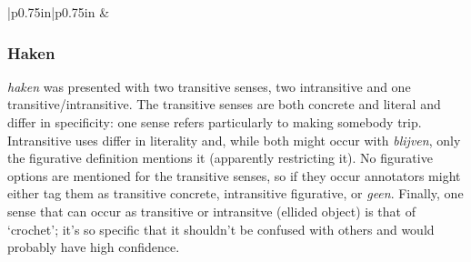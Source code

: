 \documentclass[
]{book}
\begin{document}
\begin{longtable}[c]{|p{0.75in}|p{0.75in}}
 &  \\

\noalign{\global\setlength{\arrayrulewidth}{2pt}}

\end{longtable}

\hypertarget{haken}{%
\subsubsection{Haken}\label{haken}}

\emph{haken} was presented with two transitive senses, two intransitive and one transitive/intransitive. The transitive senses are both concrete and literal and differ in specificity: one sense refers particularly to making somebody trip. Intransitive uses differ in literality and, while both might occur with \emph{blijven}, only the figurative definition mentions it (apparently restricting it). No figurative options are mentioned for the transitive senses, so if they occur annotators might either tag them as transitive concrete, intransitive figurative, or \emph{geen}. Finally, one sense that can occur as transitive or intransitve (ellided object) is that of `crochet'; it's so specific that it shouldn't be confused with others and would probably have high confidence.

\providecommand{\docline}[3]{\noalign{\global\setlength{\arrayrulewidth}{#1}}\arrayrulecolor[HTML]{#2}\cline{#3}}

\setlength{\tabcolsep}{2pt}

\renewcommand*{\arraystretch}{1.5}
\end{document}
